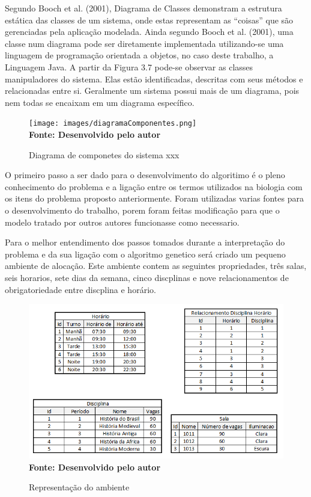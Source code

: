 \documentclass{abntpuc}
\begin{document}
Segundo Booch et al. (2001), Diagrama de Classes demonstram a estrutura estática
das classes de um sistema, onde estas representam as “coisas” que são gerenciadas pela
aplicação modelada. Ainda segundo Booch et al. (2001), uma classe num diagrama pode
ser diretamente implementada utilizando-se uma linguagem de programação orientada a
objetos, no caso deste trabalho, a Linguagem Java.
A partir da Figura 3.7 pode-se observar as classes manipuladores do sistema. Elas
estão identificadas, descritas com seus métodos e relacionadas entre si. Geralmente um
sistema possui mais de um diagrama, pois nem todas se encaixam em um diagrama
específico.

\begin{figure}[!htb]
\caption[Diagrama de componetes do sistema xxx]{Diagrama de componetes do sistema xxx}
\label{fig:figura1}
\centering
\texttt{[image: images/diagramaComponentes.png]}
\\ \textbf{\footnotesize Fonte: Desenvolvido pelo autor}
\end{figure}



O primeiro passo a ser dado para o desenvolvimento do algoritimo é o pleno conhecimento do problema e a ligação entre os termos utilizados na biologia com os itens do problema proposto anteriormente. Foram utilizadas varias fontes para o desenvolvimento do trabalho, porem foram feitas modificação para que o modelo tratado por outros autores funcionasse como necessario.\par

Para o melhor entendimento dos passos tomados durante a interpretação do problema e da sua ligação com o algoritmo genetico será criado um pequeno ambiente de alocação. Este ambiente contem as seguintes propriedades, três salas, seis horarios, sete dias da semana, cinco discplinas e nove relacionamentos de obrigatoriedade entre discplina e horário.\par

\begin{figure}[!htb]
\caption[Representação do ambiente]{Representação do ambiente}
\label{fig:figura1}
\centering
\includegraphics[scale=0.8]{imagens/representacaoAmbiente.png}
\\ \textbf{\footnotesize Fonte: Desenvolvido pelo autor}
\end{figure}
\end{document}
